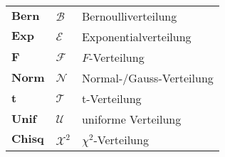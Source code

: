 \begin{longtable}{p{}p{}p{}}
  $\mathbf{Bern}$   &  $\mathcal{B}$   & Bernoulliverteilung \\
  $\mathbf{Exp}$    &  $\mathcal{E}$   & Exponentialverteilung \\
  $\mathbf{F}$      &  $\mathcal{F}$   & $F$-Verteilung \\
  $\mathbf{Norm}$   &  $\mathcal{N}$   & Normal-\slash Gauss-Verteilung \\
  $\mathbf{t}$      &  $\mathcal{T}$   & t-Verteilung \\
  $\mathbf{Unif}$   &  $\mathcal{U}$   & uniforme Verteilung \\
  $\mathbf{Chisq}$  &  $\mathcal{X^2}$ & $\chi^2$-Verteilung \\
\end{longtable}
